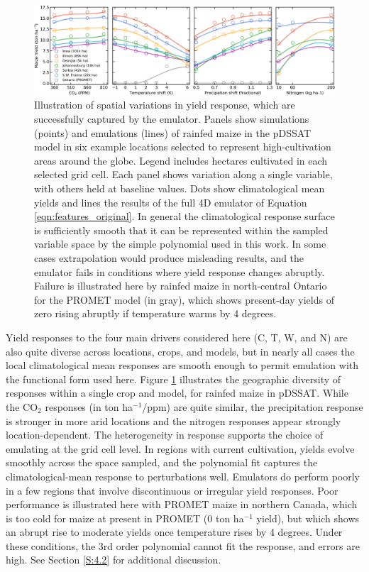 \documentclass[gmdd]{copernicus} %
\begin{document}
\begin{figure}[ht]
\centering
    \includegraphics[width=16.3cm]{figures/regression_example.png}
    \caption{
    Illustration of spatial variations in yield response, which are successfully captured by the emulator. 
    Panels show simulations (points) and emulations (lines) of rainfed maize in the pDSSAT model in six example locations selected to represent high-cultivation areas around the globe. 
    Legend includes hectares cultivated in each selected grid cell. 
    Each panel shows variation along a single variable, with others held at baseline values. 
    Dots show climatological mean yields and lines the results of the full 4D emulator of Equation \ref{eqn:features_original}. 
    In general the climatological response surface is sufficiently smooth that it can be represented within the sampled variable space by the simple polynomial used in this work. 
    In some cases extrapolation would produce misleading results, and the emulator fails in conditions where yield response changes abruptly. 
    Failure is illustrated here by rainfed maize in north-central Ontario for the PROMET model (in gray), which shows present-day yields of zero rising abruptly if temperature warms by 4 degrees.
    }
   \label{fig:regression}
\end{figure}

Yield responses to the four main drivers considered here (C, T, W, and N) are also quite diverse across locations, crops, and models, but in nearly all cases the local climatological mean responses are smooth enough to permit emulation with the functional form used here.
Figure \ref{fig:regression} illustrates the geographic diversity of responses within a single crop and model, for rainfed maize in pDSSAT. 
While the CO$_2$ responses (in ton ha$^{-1}$/ppm) are quite similar, the  precipitation response is stronger in more arid locations and the nitrogen responses appear strongly location-dependent. 
The heterogeneity in response supports the choice of emulating at the grid cell level. 
In regions with current cultivation, yields evolve smoothly across the space sampled, and the polynomial fit captures the climatological-mean response to perturbations well. 
Emulators do perform poorly in a few regions that involve discontinuous or irregular yield responses. 
Poor performance is illustrated here with PROMET maize in northern Canada, which is too cold for maize at present in PROMET (0 ton ha$^{-1}$ yield), but which shows an abrupt rise to moderate yields once temperature rises by 4 degrees.
Under these conditions, the 3rd order polynomial cannot fit the response, and errors are high. See Section \ref{S:4.2} for additional discussion. 
\end{document}
